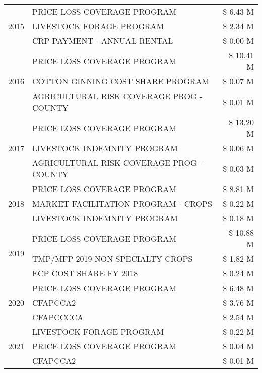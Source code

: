 \begin{tabular}{llr}
\multirow[t]{3}{*}{2015} & PRICE LOSS COVERAGE PROGRAM & \$ 6.43 M \\
 & LIVESTOCK FORAGE PROGRAM & \$ 2.34 M \\
 & CRP PAYMENT - ANNUAL RENTAL & \$ 0.00 M \\
\cline{1-3}
\multirow[t]{3}{*}{2016} & PRICE LOSS COVERAGE PROGRAM & \$ 10.41 M \\
 & COTTON GINNING COST SHARE PROGRAM & \$ 0.07 M \\
 & AGRICULTURAL RISK COVERAGE PROG - COUNTY & \$ 0.01 M \\
\cline{1-3}
\multirow[t]{3}{*}{2017} & PRICE LOSS COVERAGE PROGRAM & \$ 13.20 M \\
 & LIVESTOCK INDEMNITY PROGRAM & \$ 0.06 M \\
 & AGRICULTURAL RISK COVERAGE PROG - COUNTY & \$ 0.03 M \\
\cline{1-3}
\multirow[t]{3}{*}{2018} & PRICE LOSS COVERAGE PROGRAM & \$ 8.81 M \\
 & MARKET FACILITATION PROGRAM - CROPS & \$ 0.22 M \\
 & LIVESTOCK INDEMNITY PROGRAM & \$ 0.18 M \\
\cline{1-3}
\multirow[t]{3}{*}{2019} & PRICE LOSS COVERAGE PROGRAM & \$ 10.88 M \\
 & TMP/MFP 2019 NON SPECIALTY CROPS & \$ 1.82 M \\
 & ECP COST SHARE FY 2018 & \$ 0.24 M \\
\cline{1-3}
\multirow[t]{3}{*}{2020} & PRICE LOSS COVERAGE PROGRAM & \$ 6.48 M \\
 & CFAPCCA2 & \$ 3.76 M \\
 & CFAPCCCCA & \$ 2.54 M \\
\cline{1-3}
\multirow[t]{3}{*}{2021} & LIVESTOCK FORAGE PROGRAM & \$ 0.22 M \\
 & PRICE LOSS COVERAGE PROGRAM & \$ 0.04 M \\
 & CFAPCCA2 & \$ 0.01 M \\
\cline{1-3}
\bottomrule
\end{tabular}
